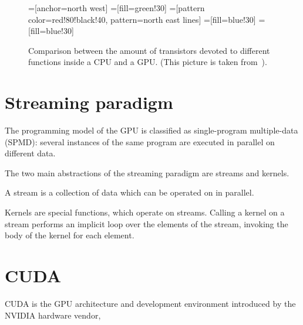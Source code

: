 \begin{figure}
  \centering
  =[anchor=north west]
  =[fill=green!30]
  =[pattern color=red!80!black!40, pattern=north east lines]
  =[fill=blue!30]
  =[fill=blue!30]
  \label{fig:transistors}
  \caption{
    Comparison between the amount of transistors
    devoted to different functions inside a CPU and a GPU.
    (This picture is taken from~\cite[\S1]{cudaprog2}).
  }
\end{figure}


\section{Streaming paradigm}

The programming model of the GPU is classified as single-program multiple-data (SPMD):
several instances of the same program are executed in parallel
on different data.

The two main abstractions of the streaming paradigm are streams and kernels.

A stream is a collection of data which can be operated on in parallel.

Kernels are special functions, which operate on streams.
Calling a kernel on a stream
performs an implicit loop over the elements of the stream,
invoking the body of the kernel for each element.


\section{CUDA}

CUDA is the GPU architecture and development environment
introduced by the NVIDIA hardware vendor,








